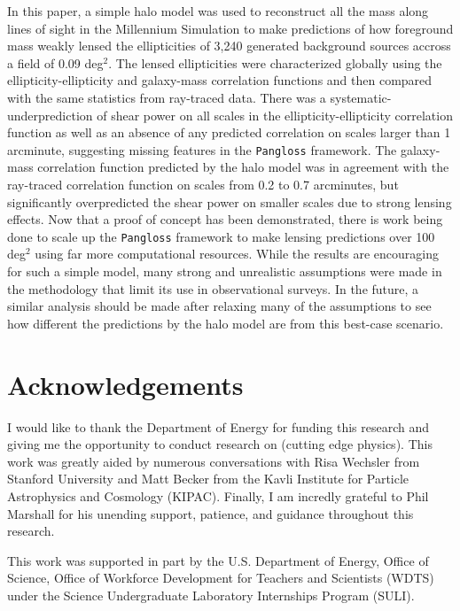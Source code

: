 \documentclass[%
 reprint,
 amsmath,amssymb,
 aps,nofootinbib
]{revtex4-1}
\begin{document}
In this paper, a simple halo model was used to reconstruct all the mass along lines of sight in the Millennium Simulation to make predictions of how foreground mass weakly lensed the ellipticities of 3,240 generated background sources accross a field of 0.09 deg$^2$. The lensed ellipticities were characterized globally using the ellipticity-ellipticity and galaxy-mass correlation functions and then compared with the same statistics from ray-traced data. There was a systematic-underprediction of shear power on all scales in the ellipticity-ellipticity correlation function as well as an absence of any predicted correlation on scales larger than 1 arcminute, suggesting missing features in the \texttt{Pangloss} framework. The galaxy-mass correlation function predicted by the halo model was in agreement with the ray-traced correlation function on scales from 0.2 to 0.7 arcminutes, but significantly overpredicted the shear power on smaller scales due to strong lensing effects. Now that a proof of concept has been demonstrated, there is work being done to scale up the \texttt{Pangloss} framework to make lensing predictions over 100 deg$^2$ using far more computational resources. While the results are encouraging for such a simple model, many strong and unrealistic assumptions were made in the methodology that limit its use in observational surveys. In the future, a similar analysis should be made after relaxing many of the assumptions to see how different the predictions by the halo model are from this best-case scenario.  

\section{Acknowledgements}

I would like to thank the Department of Energy for funding this research and giving me the opportunity to conduct research on (cutting edge physics). This work was greatly aided by numerous conversations with Risa Wechsler from Stanford University and Matt Becker from the Kavli Institute for Particle Astrophysics and Cosmology (KIPAC). Finally, I am incredly grateful to Phil Marshall for his unending support, patience, and guidance throughout this research.

This work was supported in part by the U.S. Department of Energy, Office of Science, Office of Workforce Development for Teachers and Scientists (WDTS) under the Science Undergraduate Laboratory Internships Program (SULI).

\onecolumngrid
\end{document}
